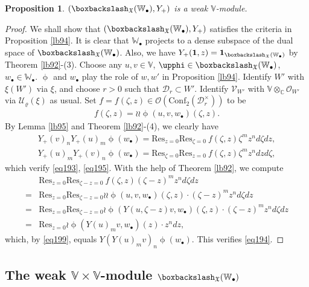 \documentclass[12pt,b5paper,notitlepage]{report}
\theoremstyle{definition}
\theoremstyle{plain}
\newtheorem{pp}[df]{Proposition}
\newcommand{\fk}{\mathfrak}
\newcommand{\mc}{\mathcal}
\newcommand{\id}{\mathbf{1}}
\newcommand{\Conf}{\mathrm{Conf}}
\newcommand{\Res}{\mathrm{Res}}
\newcommand{\scr}{\mathscr}
\newcommand{\blt}{\bullet}
\newcommand{\Vbb}{\mathbb V}
\newcommand{\Wbb}{\mathbb W}
\newcommand{\Cbb}{\mathbb C}
\numberwithin{equation}{section}
\begin{document}
\begin{pp}
$(\boxbackslash_{\fk X}(\Wbb_\blt),Y_+)$ is a weak $\Vbb$-module.
\end{pp}


\begin{proof}
We shall show that $(\boxbackslash_{\fk X}(\Wbb_\blt),Y_+)$ satisfies the criteria in Proposition \ref{lb94}. It is clear  that $\Wbb_\blt$ projects to a dense subspace of the dual space of $\boxbackslash_{\fk X}(\Wbb_\blt)$. Also, we have $Y_+(\id,z)=\id_{\boxbackslash_{\fk X}(\Wbb_\blt)}$ by Theorem \ref{lb92}-(3). Choose any $u,v\in\Vbb$, $\upphi\in\boxbackslash_{\fk X}(\Wbb_\blt)$, $w_\blt\in\Wbb_\blt$. $\upphi$ and $w_\blt$ play the role of $w,w'$ in Proposition \ref{lb94}. Identify $W'$ with $\xi(W')$ via $\xi$, and choose $r>0$ such that $\mc D_r\subset W'$. Identify $\scr V_{W'}$ with $\Vbb\otimes_\Cbb\scr O_{W'}$ via $\mc U_\varrho(\xi)$ as usual. Set $f=f(\zeta,z)\in\scr O(\Conf_2(\mc D_r^\times))$ to be
\begin{align*}
f(\zeta,z)=\wr\wr\upphi(u,v,w_\blt)(\zeta,z).
\end{align*}
By Lemma \ref{lb95} and Theorem \ref{lb92}-(4), we clearly have
\begin{gather*}
Y_+(v)_nY_+(u)_m\upphi(w_\blt)=\Res_{z=0}\Res_{\zeta=0}~f(\zeta,z)\zeta^m z^nd\zeta dz,\\
Y_+(u)_mY_+(v)_n\upphi(w_\blt)=\Res_{\zeta=0}\Res_{z=0}~f(\zeta,z)\zeta^mz^ndz d\zeta,
\end{gather*}
which verify \eqref{eq193}, \eqref{eq195}. With the help of Theorem \ref{lb92}, we compute
\begin{align*}
&\Res_{z=0}\Res_{\zeta-z=0}~f(\zeta,z)(\zeta-z)^mz^nd\zeta dz\\
=&\Res_{z=0}\Res_{\zeta-z=0}\wr\wr\upphi(u,v,w_\blt)(\zeta,z)\cdot (\zeta-z)^m z^nd\zeta dz\\
=&\Res_{z=0}\Res_{\zeta-z=0}\wr\upphi(Y(u,\zeta-z)v,w_\blt)(\zeta,z)\cdot(\zeta-z)^m z^nd\zeta dz\\
=&\Res_{z=0}\wr\upphi(Y(u)_mv,w_\blt)(z)\cdot z^ndz,
\end{align*}
which, by \eqref{eq199}, equals $Y(Y(u)_mv)_n\upphi(w_\blt)$. This verifies \eqref{eq194}.
\end{proof}



\subsection*{The weak $\Vbb\times\Vbb$-module $\boxbackslash_{\fk X}(\Wbb_\blt)$}
\end{document}

